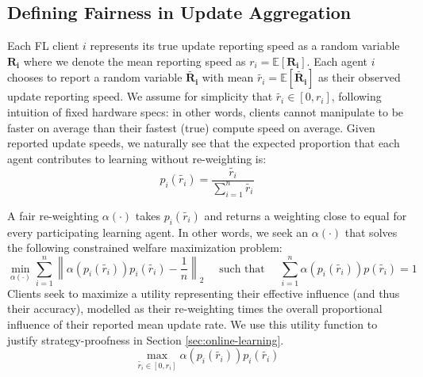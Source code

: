 \documentclass{article}
\newcommand{\red}[1]{\textcolor{red}{#1}}
\begin{document}
\subsection{Defining Fairness in Update Aggregation} \label{sec:fairness}


Each FL client $i$ represents its true update reporting speed as a random variable $\mathbf{R_i}$ where we denote the mean reporting speed as $r_i = \mathbb{E}[\mathbf{R_i}]$. Each agent $i$ chooses to report a random variable $\tilde{\mathbf{R_i}}$ with mean $\tilde{r_i} = \mathbb{E}[\tilde{\mathbf{R_i}}]$ as their observed update reporting speed. We assume for simplicity that $\tilde{r_i} \in [0, r_i]$, following intuition of fixed hardware specs: in other words, clients cannot manipulate to be faster on average than their fastest (true) compute speed on average. Given reported update speeds, we naturally see that the expected proportion that each agent contributes to learning without re-weighting is:
\begin{equation}
    p_i(\tilde{r_i}) = \frac{\tilde{r_i}}{\sum_{i=1}^n{\tilde{r_i}}}
\end{equation}

A fair re-weighting $\alpha(\cdot)$ takes $p_i(\tilde{r_i})$ and returns a weighting close to equal for every participating learning agent. In other words, we seek an $\alpha(\cdot)$ that solves the following constrained welfare maximization problem:
\begin{equation}
    \min_{\alpha(\cdot)} \sum_{i=1}^n{\left\lVert \alpha(p_i(\tilde{r_i})) p_i(\tilde{r_i}) - \frac{1}{n} \right\rVert_2} \quad \text{ such that } \quad \sum_{i=1}^n{\alpha(p_i(\tilde{r_i}))p(\tilde{r_i})} = 1
\end{equation}
Clients seek to maximize a utility representing their effective influence (and thus their accuracy), modelled as their re-weighting times the overall proportional influence of their reported mean update rate. We use this utility function to justify strategy-proofness in Section \ref{sec:online-learning}.
\begin{equation}
    \max_{\tilde{r_i}  \in [0, r_i]}{\alpha(p_i(\tilde{r_i})) p_i(\tilde{r_i})}
\end{equation}
\end{document}
